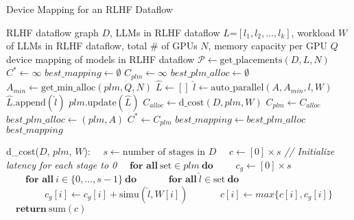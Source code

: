 \begin{algorithm}[t]
\small
\caption{Device Mapping for an RLHF Dataflow}
\label{alg:mapping}
\begin{algorithmic}[1]
 RLHF dataflow graph $D$, LLMs in RLHF dataflow $L$=$[l_1, l_2, \ldots, l_k]$,
workload $W$ of LLMs in RLHF dataflow, total \# of GPUs $N$,
memory capacity per GPU $Q$ 
 device mapping of models in RLHF dataflow
\STATE $\mathcal{P} \leftarrow \text{get\_placements}(D, L, N)$ \label{line:get_placement}
\STATE $C^{*} \leftarrow \infty$
\STATE $best\_mapping \leftarrow \emptyset$
    \STATE $C_{plm} \leftarrow \infty$
    \STATE $best\_plm\_alloc \leftarrow \emptyset$
    \STATE $A_{min} \leftarrow \text{get\_min\_alloc}(plm, Q, N)$ \label{line:get_min_alloc}
     \label{line:enum_alloc}
        \STATE $\widehat{L} \leftarrow []$ 
         \label{line:enum_all_set}
                \STATE $\widehat{l} \leftarrow \text{auto\_parallel}(A, A_{min}, l, W)$ \label{line:auto_parallel}
                \STATE $\widehat{L}.\text{append}(\widehat{l})$
            \ENDFOR
        \ENDFOR
        \STATE $plm.\text{update}(\widehat{L})$ 
        \STATE $C_{alloc} \leftarrow \text{d\_cost}(D, plm, W)$ \label{line: d_cost_call}
         \label{line:start_compare_best}
            \STATE $C_{plm} \leftarrow C_{alloc}$
            \STATE $best\_plm\_alloc \leftarrow (plm, A)$
        \ENDIF
    \ENDFOR
        \STATE $C^{*} \leftarrow C_{plm}$
        \STATE $best\_mapping \leftarrow best\_plm\_alloc$ \label{line:end_compare_best}
    \ENDIF
\ENDFOR
\RETURN $best\_mapping$


\vspace{0.5mm}
 d\_cost($D$, $plm$, $W$): \label{line:d_cost}
\STATE $\quad s \gets \text{number of stages in } D$
\STATE $\quad c \gets [0] \times s$ 
\textit{ // Initialize latency for each stage to 0} 
\STATE $\quad \textbf{for all}\  \text{set} \in plm \ \textbf{do}$
    \STATE $\quad \quad c_{g} \gets [0] \times s$
    \STATE $\quad \quad \textbf{for all}\  i \in \{0, ..., s-1\} \ \textbf{do}$
        \STATE $\quad \quad \quad \textbf{for all}\  \widehat{l} \in \text{set} \ \textbf{do}$
            \STATE $\quad \quad \quad \quad c_g[i] \gets  c_g[i] + \text{simu}(\widehat{l}, W[i])$
            \label{alg:d_cost_sum_up}
    \STATE $\quad \quad \quad c[i] \gets  max\{c[i], c_g[i]\}$ \label{alg:d_cost_max}
\STATE $\quad \textbf{return} \  \text{sum}(c)$ 

\end{algorithmic}
\end{algorithm}



